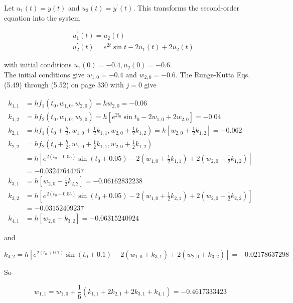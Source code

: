 \begin{mysolution}
Let $u_{1}(t)=y(t)$ and $u_{2}(t)=y^{\prime}(t)$. This transforms the second-order equation into the system

$$
\begin{aligned}
& u_{1}^{\prime}(t)=u_{2}(t) \\
& u_{2}^{\prime}(t)=e^{2 t} \sin t-2 u_{1}(t)+2 u_{2}(t)
\end{aligned}
$$

with initial conditions $u_{1}(0)=-0.4, u_{2}(0)=-0.6$.\\
The initial conditions give $w_{1,0}=-0.4$ and $w_{2,0}=-0.6$. The Runge-Kutta Eqs. (5.49) through (5.52) on page 330 with $j=0$ give

$$
\begin{aligned}
k_{1,1} & =h f_{1}\left(t_{0}, w_{1,0}, w_{2,0}\right)=h w_{2,0}=-0.06 \\
k_{1,2} & =h f_{2}\left(t_{0}, w_{1,0}, w_{2,0}\right)=h\left[e^{2 t_{0}} \sin t_{0}-2 w_{1,0}+2 w_{2,0}\right]=-0.04 \\
k_{2,1} & =h f_{1}\left(t_{0}+\frac{h}{2}, w_{1,0}+\frac{1}{2} k_{1,1}, w_{2,0}+\frac{1}{2} k_{1,2}\right)=h\left[w_{2,0}+\frac{1}{2} k_{1,2}\right]=-0.062 \\
k_{2,2} & =h f_{2}\left(t_{0}+\frac{h}{2}, w_{1,0}+\frac{1}{2} k_{1,1}, w_{2,0}+\frac{1}{2} k_{1,2}\right) \\
& =h\left[e^{2\left(t_{0}+0.05\right)} \sin \left(t_{0}+0.05\right)-2\left(w_{1,0}+\frac{1}{2} k_{1,1}\right)+2\left(w_{2,0}+\frac{1}{2} k_{1,2}\right)\right] \\
& =-0.03247644757 \\
k_{3,1} & =h\left[w_{2,0}+\frac{1}{2} k_{2,2}\right]=-0.06162832238 \\
k_{3,2} & =h\left[e^{2\left(t_{0}+0.05\right)} \sin \left(t_{0}+0.05\right)-2\left(w_{1,0}+\frac{1}{2} k_{2,1}\right)+2\left(w_{2,0}+\frac{1}{2} k_{2,2}\right)\right] \\
& =-0.03152409237 \\
k_{4,1} & =h\left[w_{2,0}+k_{3,2}\right]=-0.06315240924
\end{aligned}
$$

and

$$
k_{4,2}=h\left[e^{2\left(t_{0}+0.1\right)} \sin \left(t_{0}+0.1\right)-2\left(w_{1,0}+k_{3,1}\right)+2\left(w_{2,0}+k_{3,2}\right)\right]=-0.02178637298
$$

So

$$
w_{1,1}=w_{1,0}+\frac{1}{6}\left(k_{1,1}+2 k_{2,1}+2 k_{3,1}+k_{4,1}\right)=-0.4617333423
$$


\end{mysolution}
